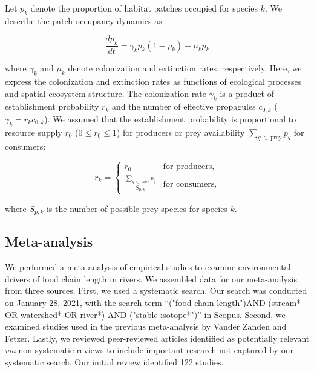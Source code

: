 \documentclass[11pt, class=article, crop=false]{standalone}
\begin{document}
Let $p_k$ denote the proportion of habitat patches occupied for species $k$.
We describe the patch occupancy dynamics as:

\begin{equation}
    \frac{dp_k}{dt} = \gamma_{k} p_k (1 - p_k) - \mu_k p_k
\end{equation}

where $\gamma_k$ and $\mu_k$ denote colonization and extinction rates, respectively.
Here, we express the colonization and extinction rates as functions of ecological processes and spatial ecosystem structure.
The colonization rate $\gamma_k$ is a product of establishment probability $r_k$ and the number of effective propagules $c_{0,k}$ ($\gamma_k = r_k c_{0,k}$).
We assumed that the establishment probability is proportional to resource supply $r_0$ ($0 \le r_0 \le 1$) for producers or prey availability $\sum_{q~\in~\text{prey}} p_{q}$ for consumers:

\begin{equation}
    r_{k} = 
    \begin{cases}
        r_0 & \text{for producers,}\\
        \frac{\sum_{q~\in~\text{prey}} p_{q}}{S_{p,k}} & \text{for consumers,}
    \end{cases}
\end{equation}

where $S_{p,k}$ is the number of possible prey species for species $k$.


\subsection{Meta-analysis}

We performed a meta-analysis of empirical studies to examine environmental drivers of food chain length in rivers.
We assembled data for our meta-analysis from three sources.
First, we used a systematic search. 
Our search was conducted on January 28, 2021, with the search term ``("food chain length")AND (stream* OR watershed* OR river*) AND ("stable isotope*")'' in Scopus.
Second, we examined studies used in the previous meta-analysis by Vander Zanden and Fetzer.
Lastly, we reviewed peer-reviewed articles identified as potentially relevant \textit{via} non-systematic reviews to include important research not captured by our systematic search.
Our initial review identified 122 studies.
\end{document}
